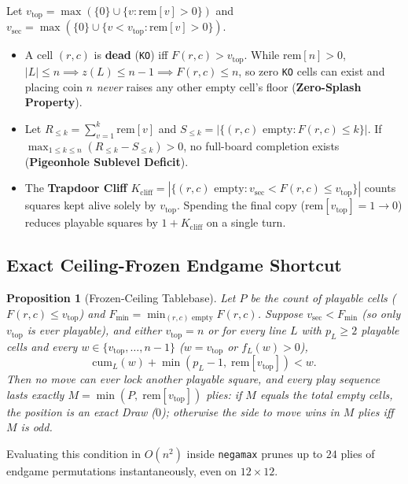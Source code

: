 \documentclass[10pt,a4paper]{article}
\newtheorem{proposition}[theorem]{Proposition}
\theoremstyle{remark}
\begin{document}
Let $v_{\mathrm{top}} = \max(\{0\} \cup \{v : \mathrm{rem}[v] > 0\})$ and $v_{\mathrm{sec}} = \max(\{0\} \cup \{v < v_{\mathrm{top}} : \mathrm{rem}[v] > 0\})$.
\begin{itemize}[nosep]
  \item A cell $(r,c)$ is \textbf{dead} (\texttt{KO}) iff $F(r,c) > v_{\mathrm{top}}$. While $\mathrm{rem}[n] > 0$, $|L| \le n \implies z(L) \le n-1 \implies F(r,c) \le n$, so zero \texttt{KO} cells can exist and placing coin $n$ \emph{never} raises any other empty cell's floor (\textbf{Zero-Splash Property}).
  \item Let $R_{\le k} = \sum_{v=1}^{k} \mathrm{rem}[v]$ and $S_{\le k} = |\{(r,c)\text{ empty} : F(r,c) \le k\}|$. If $\max_{1 \le k \le n}(R_{\le k} - S_{\le k}) > 0$, no full-board completion exists (\textbf{Pigeonhole Sublevel Deficit}).
  \item The \textbf{Trapdoor Cliff} $K_{\mathrm{cliff}} = |\{(r,c)\text{ empty} : v_{\mathrm{sec}} < F(r,c) \le v_{\mathrm{top}}\}|$ counts squares kept alive solely by $v_{\mathrm{top}}$. Spending the final copy ($\mathrm{rem}[v_{\mathrm{top}}] = 1 \to 0$) reduces playable squares by $1 + K_{\mathrm{cliff}}$ on a single turn.
\end{itemize}

\subsection{Exact Ceiling-Frozen Endgame Shortcut}

\begin{proposition}[Frozen-Ceiling Tablebase]
Let $P$ be the count of playable cells ($F(r,c) \le v_{\mathrm{top}}$) and $F_{\min} = \min_{(r,c)\text{ empty}} F(r,c)$. Suppose $v_{\mathrm{sec}} < F_{\min}$ (so only $v_{\mathrm{top}}$ is ever playable), and either $v_{\mathrm{top}} = n$ or for every line $L$ with $p_L \ge 2$ playable cells and every $w \in \{v_{\mathrm{top}},\dots,n-1\}$ ($w = v_{\mathrm{top}}$ or $f_L(w) > 0$),
\[
  \mathrm{cum}_L(w) + \min(p_L - 1,\; \mathrm{rem}[v_{\mathrm{top}}]) < w.
\]
Then no move can ever lock another playable square, and every play sequence lasts \emph{exactly} $M = \min(P,\; \mathrm{rem}[v_{\mathrm{top}}])$ plies: if $M$ equals the total empty cells, the position is an exact Draw ($0$); otherwise the side to move wins in $M$ plies iff $M$ is odd.
\end{proposition}

Evaluating this condition in $O(n^2)$ inside \texttt{negamax} prunes up to $24$ plies of endgame permutations instantaneously, even on $12 \times 12$.
\end{document}

